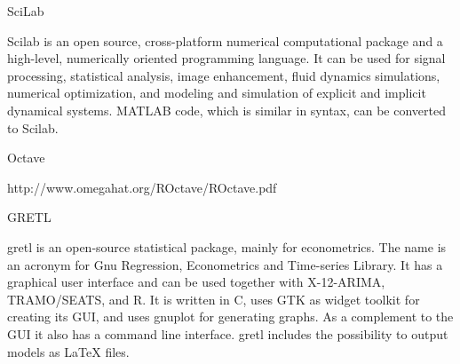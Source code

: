 SciLab

Scilab is an open source, cross-platform numerical computational package and a high-level, 
numerically oriented programming language. It can be used for signal processing, 
statistical analysis, image enhancement, fluid dynamics simulations, numerical 
optimization, and modeling and simulation of explicit and implicit dynamical systems. 
MATLAB code, which is similar in syntax, can be converted to Scilab.


Octave

http://www.omegahat.org/ROctave/ROctave.pdf

GRETL

gretl is an open-source statistical package, mainly for econometrics. 
The name is an acronym for Gnu Regression, Econometrics and Time-series Library. 
It has a graphical user interface and can be used together with X-12-ARIMA, TRAMO/SEATS, and R.  It is written in C, uses GTK as widget toolkit for creating its GUI, and uses gnuplot for generating graphs. As a complement to the GUI it also has a command line interface.
gretl includes the possibility to output models as LaTeX files.

